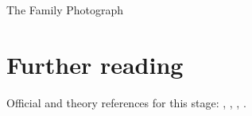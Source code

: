 \begin{ledger}{The Family Photograph}
\end{ledger}

\section{Further reading}
\label{sec:family_photograph:further_reading}
Official and theory references for this stage: \cite{Banfi:2006hf}, \cite{Caletti:2022hnc}, \cite{Caletti:2022glq}, \cite{Cacciari:2008gp}.

\begin{pitfalls}
\end{pitfalls}

\begin{exercises}
\item {}
\item {}
\end{exercises}

